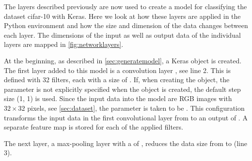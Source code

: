 {The layers described previously are now used to create a model for classifying the dataset \ac{cifar}-10 with Keras. Here we look at how these layers are applied in the Python environment and how the size and dimension of the data changes between each layer. The dimensions of the input as well as output data of the individual layers are mapped in \cref{fig:networklayers}.


At the beginning, as described in \cref{sec:generatemodel}, a Keras object  is created. The first layer added to this model is a convolution layer , see line 2. This is defined with 32 filters, each with a size of . If, when creating the object, the parameter  is not explicitly specified when the object is created, the default step size (1, 1) is used. Since the input data into the model are RGB images with $32 \times 32$ pixels, see \cref{sec:dataset}, the parameter  is taken to be . This configuration transforms the input data in the first convolutional layer from  to an output of . A separate feature map is stored for each of the applied filters.

The next layer, a max-pooling layer with a  of , reduces the data size from  to  (line 3).

}

